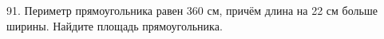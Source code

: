 91. Периметр прямоугольника равен 360 см, причём длина на 22 см больше ширины. Найдите площадь прямоугольника.\\
